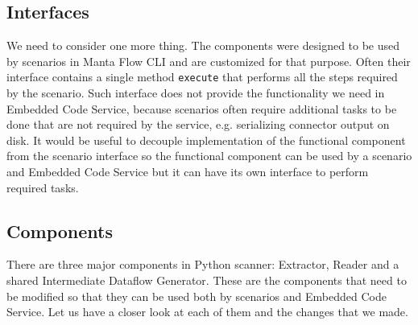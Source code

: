 \subsection{Interfaces}
We need to consider one more thing. The components were designed to be used by scenarios in Manta Flow CLI and are customized for that purpose. Often their interface contains a single method \texttt{execute} that performs all the steps required by the scenario. Such interface does not provide the functionality we need in Embedded Code Service, because scenarios often require additional tasks to be done that are not required by the service, e.g. serializing connector output on disk. It would be useful to decouple implementation of the functional component from the scenario interface so the functional component can be used by a scenario and Embedded Code Service but it can have its own interface to perform required tasks.

\subsection{Components}
There are three major components in Python scanner: Extractor, Reader and a shared Intermediate Dataflow Generator. These are the components that need to be modified so that they can be used both by scenarios and Embedded Code Service. Let us have a closer look at each of them and the changes that we made.

